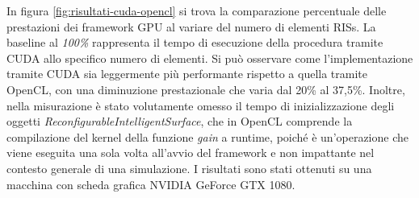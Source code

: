 In figura \ref{fig:risultati-cuda-opencl} si trova la comparazione percentuale
delle prestazioni dei framework GPU al variare del numero di elementi RISs. La baseline
al \textit{100\%} rappresenta il tempo di esecuzione della procedura tramite
CUDA allo specifico numero di elementi. Si può osservare come l'implementazione tramite
CUDA sia leggermente più performante rispetto a quella tramite OpenCL, con una
diminuzione prestazionale che varia dal 20\% al 37,5\%. Inoltre, nella
misurazione è stato volutamente omesso il tempo di inizializzazione degli
oggetti \textit{ReconfigurableIntelligentSurface}, che in OpenCL comprende la
compilazione del kernel della funzione \textit{gain} a runtime, poiché è un'operazione
che viene eseguita una sola volta all'avvio del framework e non impattante nel
contesto generale di una simulazione. I risultati sono stati ottenuti su una macchina
con scheda grafica NVIDIA GeForce GTX 1080.

